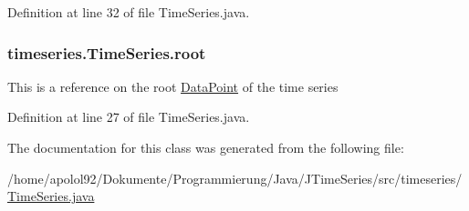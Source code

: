 Definition at line 32 of file Time\+Series.\+java.

\hypertarget{classtimeseries_1_1_time_series_affc228300a6e7aeff7646df39da9269a}{}
\subsubsection[{root}]{ timeseries.\+Time\+Series.\+root\hspace{0.3cm}{\ttfamily [protected]}}\label{classtimeseries_1_1_time_series_affc228300a6e7aeff7646df39da9269a}
This is a reference on the root \hyperlink{classtimeseries_1_1_data_point}{Data\+Point} of the time series 

Definition at line 27 of file Time\+Series.\+java.



The documentation for this class was generated from the following file\+:\begin{DoxyCompactItemize}
\item 
/home/apolol92/\+Dokumente/\+Programmierung/\+Java/\+J\+Time\+Series/src/timeseries/\hyperlink{_time_series_8java}{Time\+Series.\+java}\end{DoxyCompactItemize}
